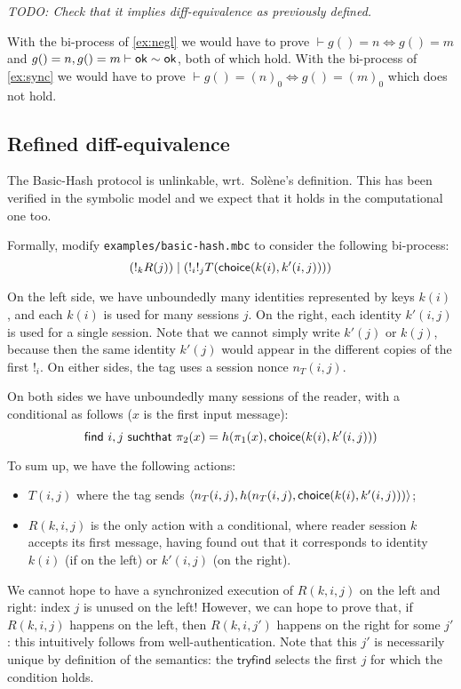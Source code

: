 \emph{TODO: Check that it implies diff-equivalence as previously defined.}

\begin{example}
  With the bi-process of \cref{ex:negl} we would have to prove
  $\vdash g() = n \Leftrightarrow g() = m$ and
  $g()=n, g()=m \vdash \mathsf{ok} \sim \mathsf{ok}$, both of which hold.
  With the bi-process of \cref{ex:sync} we would have to prove
  $\vdash g() = (n)_0 \Leftrightarrow g() = (m)_0$ which does not hold.
\end{example}

\subsection{Refined diff-equivalence} \label{sec:refined-diff}

The Basic-Hash protocol is unlinkable, wrt.\ Solène's definition.
This has been verified in the symbolic model and we expect that it holds
in the computational one too.

Formally, modify \texttt{examples/basic-hash.mbc} to consider the
following bi-process:
$$(!_k R(j)) \mid (!_i !_j T(\mathsf{choice}(k(i),k'(i,j))))$$

On the left side, we have unboundedly many
identities represented by keys $k(i)$, and each $k(i)$ is used for
many sessions $j$.
On the right, each identity $k'(i,j)$ is used for a single session.
Note that we cannot simply write $k'(j)$ or $k(j)$, because then the
same identity $k'(j)$ would appear in the different copies of the
first $!_i$.
On either sides, the tag uses a session nonce $n_T(i,j)$.

On both sides we have unboundedly many sessions of the reader,
with a conditional as follows ($x$ is the first input message):
$$\mathsf{find} \ i,j \ \mathsf{suchthat} \ \pi_2(x) = 
h(\pi_1(x),\mathsf{choice}(k(i),k'(i,j)))$$

To sum up, we have the following actions:
\begin{itemize}
  \item $T(i,j)$ where the tag sends
    $\langle n_T(i,j),h(n_T(i,j),\mathsf{choice}(k(i),k'(i,j))) \rangle$;
  \item $R(k,i,j)$ is the only action with a conditional,
    where reader session $k$ accepts its first message,
    having found out that it corresponds to identity $k(i)$ (if on
    the left) or $k'(i,j)$ (on the right).
\end{itemize}

We cannot hope to have a synchronized execution of $R(k,i,j)$ on the
left and right: index $j$ is unused on the left!
However, we can hope to prove that, if $R(k,i,j)$ happens on the left,
then $R(k,i,j')$ happens on the right for some $j'$: this intuitively
follows from well-authentication.
Note that this $j'$ is necessarily unique by definition of the semantics:
the $\mathsf{tryfind}$ selects the first $j$ for which the condition holds.

